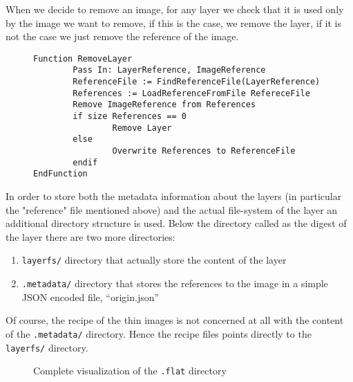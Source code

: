 When we decide to remove an image, for any layer we check that it is used only
by the image we want to remove, if this is the case, we remove the layer, if it
is not the case we just remove the reference of the image.

\begin{figure}
\begin{lstlisting}[caption={Algorithm to remove an image from the file-system}, label={lst:remove-layer}]
Function RemoveLayer
        Pass In: LayerReference, ImageReference
        ReferenceFile := FindReferenceFile(LayerReference)
        References := LoadReferenceFromFile RefereceFile
        Remove ImageReference from References
        if size References == 0
                Remove Layer
        else
                Overwrite References to ReferenceFile
        endif
EndFunction
\end{lstlisting}
\end{figure}

In order to store both the metadata information about the layers (in particular
the "reference" file mentioned above) and the actual file-system of the layer
an additional directory structure is used. Below the directory called as the
digest of the layer there are two more directories: 
\begin{enumerate} 
        \item \texttt{layerfs/} directory that actually store the content of the layer
        \item \texttt{.metadata/} directory that stores the references to the image in a simple JSON encoded file, “origin.json”
\end{enumerate}

Of course, the recipe of the thin images is not concerned at all with the
content of the \texttt{.metadata/} directory.  Hence the recipe files points
directly to the \texttt{layerfs/} directory.

\begin{figure}
\caption{Complete visualization of the \texttt{.flat} directory}
\label{fig:docker-layer-structure}
\end{figure}

